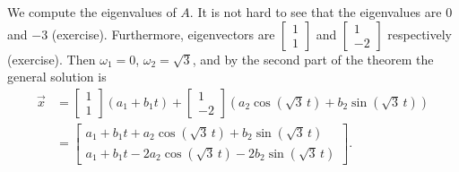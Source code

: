 \begin{example}
We compute the eigenvalues of $A$.  It is not hard to see that the eigenvalues
are 0 and $-3$ (exercise).  Furthermore,
eigenvectors are
$\left[ \begin{smallmatrix} 1 \\ 1 \end{smallmatrix} \right]$ and
$\left[ \begin{smallmatrix} 1 \\ -2 \end{smallmatrix} \right]$ respectively
(exercise). 
Then
$\omega_1 = 0$,
$\omega_2 = \sqrt{3}$, and by the second part of the theorem
the general solution is
\begin{equation*}
\begin{split}
\vec{x} & = 
\begin{bmatrix} 1 \\ 1 \end{bmatrix}
\left( a_1 + b_1 t \right) 
+
\begin{bmatrix} 1 \\ -2 \end{bmatrix}
\left( a_2 \cos ( \sqrt{3} \, t) + b_2 \sin ( \sqrt{3} \, t ) \right)
\\
& =
\begin{bmatrix}
a_1 + b_1 t + a_2 \cos ( \sqrt{3} \, t ) + b_2 \sin ( \sqrt{3} \, t
) \\
a_1 + b_1 t - 2 a_2 \cos ( \sqrt{3} \, t ) - 2 b_2 \sin ( \sqrt{3}
\, t ) 
\end{bmatrix} .
\end{split}
\end{equation*}


\end{example}
